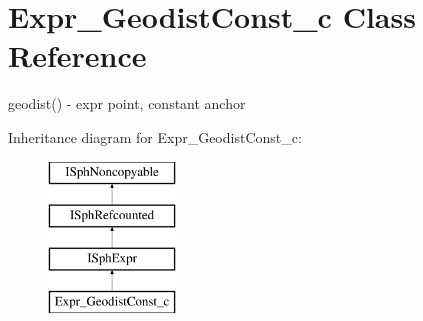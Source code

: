 \hypertarget{classExpr__GeodistConst__c}{\section{Expr\-\_\-\-Geodist\-Const\-\_\-c Class Reference}
\label{classExpr__GeodistConst__c}
}


geodist() -\/ expr point, constant anchor  


Inheritance diagram for Expr\-\_\-\-Geodist\-Const\-\_\-c\-:\begin{figure}[H]
\begin{center}
\leavevmode
\includegraphics[height=4.000000cm]{classExpr__GeodistConst__c}
\end{center}
\end{figure}
